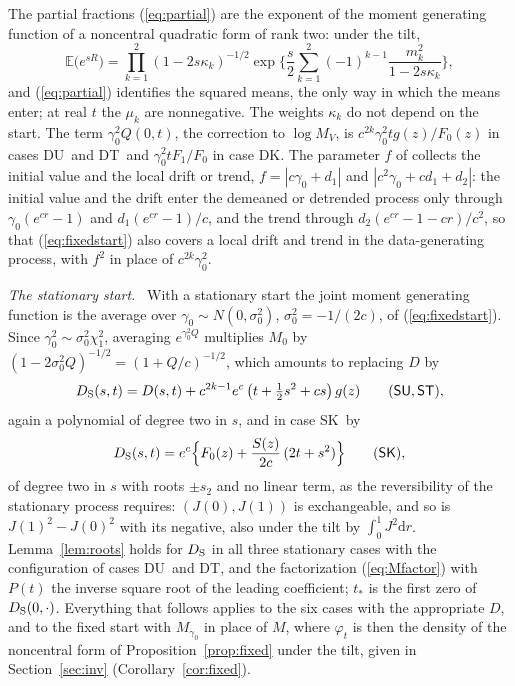 \documentclass[ecta,nameyear,final]{econsocart}
\newcommand{\E}{{\mathbb E}}
\newcommand{\dr}[1]{{\mathrm d}#1}
\newcommand{\Fk}{\textsf{\upshape DK}}
\newcommand{\Fu}{\textsf{\upshape DU}}
\newcommand{\Ft}{\textsf{\upshape DT}}
\newcommand{\Sk}{\textsf{\upshape SK}}
\newcommand{\Su}{\textsf{\upshape SU}}
\newcommand{\St}{\textsf{\upshape ST}}
\theoremstyle{plain}
\theoremstyle{definition}
\newcommand{\runin}[1]{\par\medskip\noindent\textit{#1.}\ \ignorespaces}
\begin{document}
The partial fractions (\ref{eq:partial}) are the exponent of the moment generating function of a noncentral quadratic form of rank two: under the tilt,
\[
\E\big(e^{sR}\big)=\prod_{k=1}^{2}(1-2s\kappa_k)^{-1/2}\exp\Big\{\frac s2\sum_{k=1}^{2}(-1)^{k-1}\frac{m_k^2}{1-2s\kappa_k}\Big\},
\]
and (\ref{eq:partial}) identifies the squared means, the only way in which the means enter; at real $t$ the $\mu_k$ are nonnegative.  The weights $\kappa_k$ do not depend on the start.  The term $\gamma_0^2Q(0,t)$, the correction to $\log M_V$, is $c^{2k}\gamma_0^2tg(z)/F_0(z)$ in cases \Fu\ and \Ft\ and $\gamma_0^2tF_1/F_0$ in case \Fk.  The parameter $f$ of \cite{NabeyaSorensen1994} collects the initial value and the local drift or trend, $f=|c\gamma_0+d_1|$ and $|c^2\gamma_0+cd_1+d_2|$: the initial value and the drift enter the demeaned or detrended process only through $\gamma_0(e^{cr}-1)$ and $d_1(e^{cr}-1)/c$, and the trend through $d_2(e^{cr}-1-cr)/c^2$, so that (\ref{eq:fixedstart}) also covers a local drift and trend in the data-generating process, with $f^2$ in place of $c^{2k}\gamma_0^2$.

\runin{The stationary start}  With a stationary start the joint moment generating function is the average over $\gamma_0\sim N(0,\sigma_0^2)$, $\sigma_0^2=-1/(2c)$, of (\ref{eq:fixedstart}).  Since $\gamma_0^2\sim\sigma_0^2\chi^2_1$, averaging $e^{\gamma_0^2Q}$ multiplies $M_0$ by $(1-2\sigma_0^2Q)^{-1/2}=(1+Q/c)^{-1/2}$, which amounts to replacing $D$ by
\begin{equation}
D_{\rm S}(s,t)=D(s,t)+c^{2k-1}e^c\,\big(t+\tfrac12s^2+cs\big)\,g(z)\qquad(\Su,\St),
\label{eq:Dstat}
\end{equation}
again a polynomial of degree two in $s$, and in case \Sk\ by
\begin{equation}
D_{\rm S}(s,t)=e^c\Big\{F_0(z)+\frac{S(z)}{2c}\,(2t+s^2)\Big\}\qquad(\Sk),
\label{eq:DstatK}
\end{equation}
of degree two in $s$ with roots $\pm s_2$ and no linear term, as the reversibility of the stationary process requires: $(J(0),J(1))$ is exchangeable, and so is $J(1)^2-J(0)^2$ with its negative, also under the tilt by $\int_0^1J^2\dr{r}$.  Lemma~\ref{lem:roots} holds for $D_{\rm S}$ in all three stationary cases with the configuration of cases \Fu\ and \Ft, and the factorization (\ref{eq:Mfactor}) with $P(t)$ the inverse square root of the leading coefficient; $t_*$ is the first zero of $D_{\rm S}(0,\cdot)$.  Everything that follows applies to the six cases with the appropriate $D$, and to the fixed start with $M_{\gamma_0}$ in place of $M$, where $\varphi_t$ is then the density of the noncentral form of Proposition~\ref{prop:fixed} under the tilt, given in Section~\ref{sec:inv} (Corollary~\ref{cor:fixed}).
\end{document}

